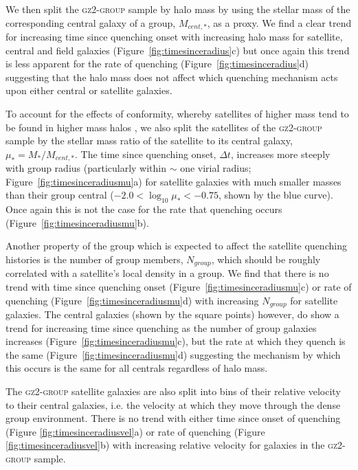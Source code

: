 \documentclass[useAMS,usenatbib]{mn2e}
\begin{document}
We then split the \textsc{gz2-group} sample by halo mass by using the stellar mass of the corresponding central galaxy of a group, $M_{cent,*}$, as a proxy. We find a clear trend for increasing time since quenching onset with increasing halo mass for satellite, central and field galaxies (Figure~\ref{fig:timesinceradius}c) but once again this trend is less apparent for the rate of quenching (Figure~\ref{fig:timesinceradius}d) suggesting that the halo mass does not affect which quenching mechanism acts upon either central or satellite galaxies. 

To account for the effects of conformity, whereby satellites of higher mass tend to be found in higher mass halos \citep{weinmann06, kauffmann13, hearin15, hatfield16}, we also split the satellites of the \textsc{gz2-group} sample by the stellar mass ratio of the satellite to its central galaxy, $\mu_* = M_*/M_{cent,*}$. The time since quenching onset, $\Delta t $, increases more steeply with group radius (particularly within $\sim$ one virial radius; Figure~\ref{fig:timesinceradiusmu}a) for satellite galaxies with much smaller masses than their group central ($-2.0 < \log_{10}\mu_* < -0.75$, shown by the blue curve). Once again this is not the case for the rate that quenching occurs (Figure~\ref{fig:timesinceradiusmu}b). 

Another property of the group which is expected to affect the satellite quenching histories is the number of group members, $N_{group}$, which should be roughly correlated with a satellite's local density in a  group. We find that there is no trend with time since quenching onset (Figure~\ref{fig:timesinceradiusmu}c) or rate of quenching (Figure~\ref{fig:timesinceradiusmu}d) with increasing $N_{group}$ for satellite galaxies. The central galaxies (shown by the square points) however, do show a trend for increasing time since quenching as the number of group galaxies increases (Figure~\ref{fig:timesinceradiusmu}c), but the rate at which they quench is the same (Figure~\ref{fig:timesinceradiusmu}d) suggesting the mechanism by which this occurs is the same for all centrals regardless of halo mass. 

The \textsc{gz2-group} satellite galaxies are also split into bins of their relative velocity to their central galaxies, i.e. the velocity at which they move through the dense group environment. There is no trend with either time since onset of quenching (Figure \ref{fig:timesinceradiusvel}a) or rate of quenching (Figure \ref{fig:timesinceradiusvel}b) with increasing relative velocity for galaxies in the \textsc{gz2-group} sample. 
\end{document}
